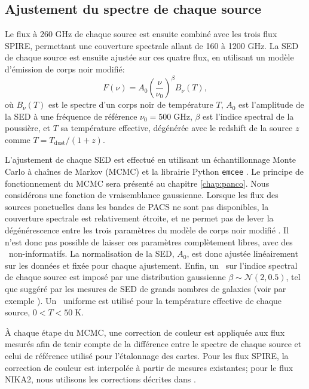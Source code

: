 \subsection{Ajustement du spectre de chaque source}

Le flux à 260 GHz de chaque source est ensuite combiné avec les trois flux SPIRE, permettant une couverture spectrale allant de 160 à 1200 GHz.
La SED de chaque source est ensuite ajustée sur ces quatre flux, en utilisant un modèle d'émission de corps noir modifié:
\begin{equation}
    F(\nu) = A_0 \left(\frac{\nu}{\nu_0}\right)^\beta B_\nu(T),
    \label{eq:pstools:sed}
\end{equation}
où $B_\nu(T)$ est le spectre d'un corps noir de température $T$, $A_0$ est l'amplitude de la SED à une fréquence de référence $\nu_0 = 500 \; \mathrm{GHz}$, $\beta$ est l'indice spectral de la poussière, et $T$ sa température effective, dégénérée avec le redshift de la source $z$ comme $T = T_\mathrm{dust} / (1+z)$.

L'ajustement de chaque SED est effectué en utilisant un échantillonnage Monte Carlo à chaînes de Markov (MCMC) et la librairie Python \texttt{emcee} \cite{foreman-mackey_emcee_2019}.
Le principe de fonctionnement du MCMC sera présenté au chapitre \ref{chap:panco}.
Nous considérons une fonction de vraisemblance gaussienne.
Lorsque les flux des sources ponctuelles dans les bandes de PACS ne sont pas disponibles, la couverture spectrale est relativement étroite, et ne permet pas de lever la dégénérescence entre les trois paramètres du modèle de corps noir modifié \cite{desert_submillimetre_2008,magnelli_herschel_2012,smith_isothermal_2013}.
Il n'est donc pas possible de laisser ces paramètres complètement libres, avec des \prior\ non-informatifs.
La normalisation de la SED, $A_0$, est donc ajustée linéairement sur les données et fixée pour chaque ajustement.
Enfin, un \prior\ sur l'indice spectral de chaque source est imposé par une distribution gaussienne $\beta \sim \mathcal{N}(2, 0.5)$, tel que suggéré par les mesures de SED de grands nombres de galaxies (voir par exemple \cite{magnelli_herschel_2012}).
Un \prior\ uniforme est utilisé pour la température effective de chaque source, $0 < T < 50 \; \mathrm{K}$.

À chaque étape du MCMC, une correction de couleur est appliquée aux flux mesurés afin de tenir compte de la différence entre le spectre de chaque source et celui de référence utilisé pour l'étalonnage des cartes.
Pour les flux SPIRE, la correction de couleur est interpolée \`a partir de mesures existantes\footnotemark ; pour le flux NIKA2, nous utilisons les corrections décrites dans \cite{perotto_calibration_2020}.

